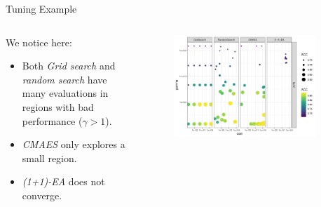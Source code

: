 \begin{frame}{Tuning Example}

\begin{columns}
\begin{column}{0.45\textwidth}
  \vspace{1em}

  We notice here:

  \begin{itemize}
      \item Both \emph{Grid search} and \emph{random search} have many evaluations in regions with bad performance ($\gamma>1$).
      \item \emph{CMAES} only explores a small region.
      \item \emph{(1+1)-EA} does not converge.
  \end{itemize}
\end{column}%
\begin{column}{0.5\textwidth}
  \vspace{-1em}
  \begin{figure}
  \includegraphics[width=0.9\textwidth]{images/benchmark_scatter.png}
  \end{figure}
\end{column}
\end{columns}

\end{frame}
